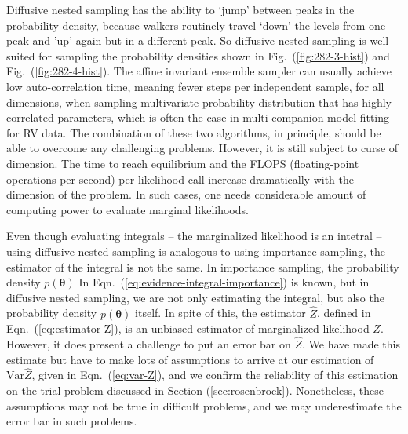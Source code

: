 \documentclass[letterpaper, preprint]{aastex}
\newcommand{\bth} {\boldsymbol \theta}
\newcommand{\var}{\mathrm{Var}}
\begin{document}
Diffusive nested sampling has the ability to `jump' between peaks in the probability density, because walkers routinely travel `down' the levels from one peak and 'up' again but in a different peak. So diffusive nested sampling is well suited for sampling the probability densities shown in Fig.~(\ref{fig:282-3-hist}) and Fig.~(\ref{fig:282-4-hist}). The affine invariant ensemble sampler can usually achieve low auto-correlation time, meaning fewer steps per independent sample, for all dimensions, when sampling multivariate probability distribution that has highly correlated parameters, which is often the case in multi-companion model fitting for RV data. The combination of these two algorithms, in principle, should be able to overcome any challenging problems. However, it is still subject to curse of dimension. The time to reach equilibrium and the FLOPS (floating-point operations per second) per likelihood call increase dramatically with the dimension of the problem. In such cases, one needs considerable amount of computing power to evaluate marginal likelihoods.

Even though evaluating integrals -- the marginalized likelihood is an intetral -- using diffusive nested sampling is analogous to using importance sampling, the estimator of the integral is not the same. In importance sampling, the probability density $p(\bth)$ In Eqn.~(\ref{eq:evidence-integral-importance}) is known, but in diffusive nested sampling, we are not only estimating the integral, but also the probability density $p(\bth)$ itself. In spite of this, the estimator $\widehat{Z}$, defined in Eqn.~(\ref{eq:estimator-Z}), is an unbiased estimator of marginalized likelihood $Z$. However, it does present a challenge to put an error bar on $\widehat{Z}$. We have made this estimate but have to make lots of assumptions to arrive at our estimation of $\var \widehat{Z}$, given in Eqn.~(\ref{eq:var-Z}), and we confirm the reliability of this estimation on the trial problem discussed in Section (\ref{sec:rosenbrock}). Nonetheless, these assumptions may not be true in difficult problems, and we may underestimate the error bar in such problems.
\end{document}
